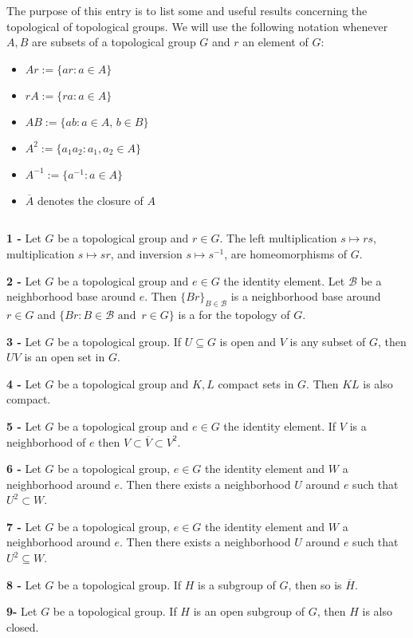 \documentclass[12pt]{article}
\begin{document}
The purpose of this entry is to list some  and useful results concerning the topological  of topological groups. We will use the following notation whenever $A, B$ are subsets of a topological group $G$ and $r$ an element of $G$:
\begin{itemize}
\item $Ar := \{ar: a \in A\}$
\item $rA := \{ra: a \in A\}$
\item $AB:=\{ab: a \in A,\, b \in B\}$
\item $A^2 := \{a_1a_2: a_1,a_2 \in A\}$
\item $A^{-1} := \{a^{-1}: a\in A\}$
\item $\overline{A}$ denotes the closure of $A$
\end{itemize}
$\quad$

{\bf {} 1 -} Let $G$ be a topological group and $r \in G$. The left multiplication $s \mapsto rs$,  multiplication $s \mapsto sr$, and inversion $s \mapsto s^{-1}$, are homeomorphisms of $G$.


{\bf {} 2 -} Let $G$ be a topological group and $e \in G$ the identity element. Let $\mathcal{B}$ be a neighborhood base around $e$. Then $\{Br\}_{B \in \mathcal{B}}$ is a neighborhood base around $r \in G$ and $\{Br:B\in \mathcal{B} \text{ and }\, r \in G \}$ is a  for the topology of $G$.


{\bf {} 3 -} Let $G$ be a topological group. If $U \subseteq G$ is open and $V$ is any subset of $G$, then $UV$ is an open set in $G$. 


{\bf {} 4 -} Let $G$ be a topological group and $K, L$ compact sets in $G$. Then $KL$ is also compact.


{\bf {} 5 -} Let $G$ be a topological group and $e \in G$ the identity element. If $V$ is a neighborhood of $e$ then $V \subset \overline{V} \subset V^2$.


{\bf {} 6 -} Let $G$ be a topological group, $e \in G$ the identity element and $W$ a neighborhood around $e$. Then there exists a neighborhood $U$ around $e$ such that $U^2 \subset W$.



{\bf {} 7 -} Let $G$ be a topological group, $e \in G$ the identity element and $W$ a neighborhood around $e$. Then there exists a  neighborhood $U$ around $e$ such that $U^2\subseteq W$.

{\bf {} 8 -} Let $G$ be a topological group. If $H$ is a subgroup of $G$, then so is $\overline{H}$.

{\bf {} 9-} Let $G$ be a topological group. If $H$ is an open subgroup of $G$, then $H$ is also closed.

 

\end{document}
